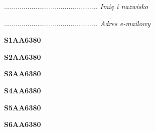 \begin{turn}{90}\begin{minipage}{\linewidth} \vspace{20mm} ................................................  \textit{Imię i nazwisko}\end{minipage}\end{turn}

\begin{turn}{90}\begin{minipage}{\linewidth} \vspace{20mm} ................................................  \textit{Adres e-mailowy}\end{minipage}\end{turn}

\begin{turn}{90}\huge \begin{minipage}{\linewidth} \vspace{10mm}\textbf{S1AA6380}\end{minipage}\end{turn}

\begin{turn}{90}\huge \begin{minipage}{\linewidth} \vspace{10mm}\textbf{S2AA6380}\end{minipage}\end{turn}

\begin{turn}{90}\huge \begin{minipage}{\linewidth} \vspace{10mm}\textbf{S3AA6380}\end{minipage}\end{turn}

\begin{turn}{90}\huge \begin{minipage}{\linewidth} \vspace{10mm}\textbf{S4AA6380}\end{minipage}\end{turn}

\begin{turn}{90}\huge \begin{minipage}{\linewidth} \vspace{10mm}\textbf{S5AA6380}\end{minipage}\end{turn}

\begin{turn}{90}\huge \begin{minipage}{\linewidth} \vspace{10mm}\textbf{S6AA6380}\end{minipage}\end{turn}

